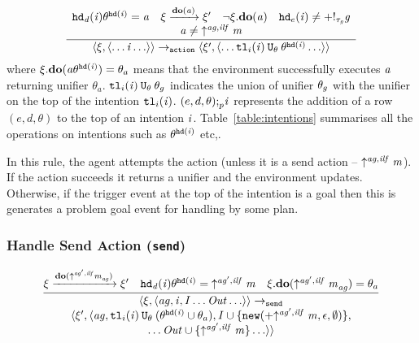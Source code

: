 \begin{equation}
\frac{
\begin{array}{c}
\mathit{{\tt hd}_d}(\mathit{i})\theta^{{\tt hd}(\mathit{i})} = \mathit{a} \quad
\xi \xrightarrow{\mathrm{\mathbf{do}}(\mathit{a})} \xi' 
\quad \neg \xi.\mathrm{\mathbf{do}}(\mathit{a}) 
\quad {\tt hd}_e(\mathit{i}) \neq +!_{\mathit{\tau_{\mathit{g}}}}\mathit{g} \\
\mathit{a} \neq \mathit{\uparrow^{\mathit{ag},ilf}\mathit{m}}
\end{array}
}{
\langle \xi, \langle \ldots  \mathit{i} \ldots \rangle \rangle \rightarrow_{\tt action} 
\langle \xi', \langle \ldots
{\tt tl}_i(\mathit{i}) \: {\tt U}_{\theta} \: \theta^{{\tt hd}(\mathit{i})}
\ldots \rangle \rangle }
\end{equation}
where $\xi.\mathrm{\mathbf{do}}(\mathit{a}\theta^{{\tt hd}(\mathit{i})}) = \theta_a$ means that the environment successfully executes $\mathit{a}$ returning unifier $\theta_a$.
${\tt tl}_i(\mathit{i}) \: {\tt U}_{\theta} \: \theta_g$ indicates the union of unifier $\theta_g$ with the unifier on the top of the intention ${\tt tl}_i(\mathit{i})$.
$(e, d, \theta) {\tt ;}_p \mathit{i}$ represents the addition of a row $(e, d, \theta)$ to the top of an intention $\mathit{i}$.
Table~\ref{table:intentions} summarises all the operations on intentions such as $\theta^{{\tt hd}(\mathit{i})}$ etc,.

In this rule, the agent attempts the action (unless it is a send action -- $\mathit{\uparrow^{\mathit{ag},ilf}\mathit{m}}$).  If the action succeeds it returns a unifier and the environment updates.  Otherwise, if the trigger event at the top of the intention is a goal then this is generates a problem goal event for handling by some plan.

\subsubsection*{Handle Send Action ({\tt send})}
\begin{equation}
\frac{\xi \xrightarrow{\mathrm{\mathbf{do}}(\mathit{\uparrow^{\mathit{ag}',ilf}\mathit{m}}_{\mathit{ag}})} \xi' \quad
\mathit{{\tt hd}_d}(\mathit{i})\theta^{{\tt hd}(\mathit{i})} =
\mathit{\uparrow^{\mathit{ag}',ilf}\mathit{m}}
\quad \xi.\mathrm{\mathbf{do}}(\mathit{\uparrow^{\mathit{ag}',ilf}\mathit{m}}_{\mathit{ag}}) = \theta_a
}{
\begin{array}{c}
\langle \xi, \langle \mathit{ag},  \mathit{i}, \mathit{I} \ldots \mathit{Out} \ldots \rangle \rangle \rightarrow_{\tt send} \\
\langle \xi', \langle \mathit{ag}, 
{\tt tl}_i(\mathit{i}) \: {\tt U}_{\theta} \:
(\theta^{{\tt hd}(\mathit{i})} \cup \theta_a), 
\mathit{I} \cup
\{{\tt new}(+\mathit{\uparrow^{\mathit{ag}',ilf}\mathit{m}}, 
\epsilon, \emptyset)\}, \\
\ldots \mathit{Out} \cup \{\mathit{\uparrow^{\mathit{ag}',ilf}\mathit{m}}\} \ldots \rangle \rangle
\end{array}
}
\end{equation}

